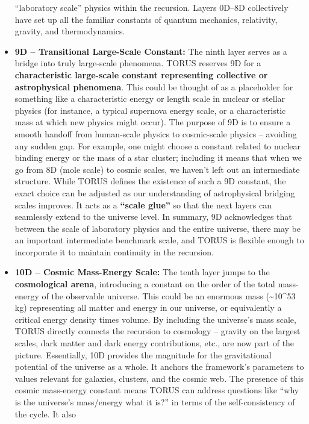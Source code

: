 \begin{itemize}
  ``laboratory scale'' physics within the recursion. Layers 0D--8D
  collectively have set up all the familiar constants of quantum
  mechanics, relativity, gravity, and thermodynamics.
\item
  \textbf{9D -- Transitional Large-Scale Constant:} The ninth layer
  serves as a bridge into truly large-scale phenomena. TORUS reserves 9D
  for a \textbf{characteristic large-scale constant representing
  collective or astrophysical phenomena}. This could be thought of as a
  placeholder for something like a characteristic energy or length scale
  in nuclear or stellar physics (for instance, a typical supernova
  energy scale, or a characteristic mass at which new physics might
  occur). The purpose of 9D is to ensure a smooth handoff from
  human-scale physics to cosmic-scale physics -- avoiding any sudden
  gap. For example, one might choose a constant related to nuclear
  binding energy or the mass of a star cluster; including it means that
  when we go from 8D (mole scale) to cosmic scales, we haven't left out
  an intermediate structure. While TORUS defines the existence of such a
  9D constant, the exact choice can be adjusted as our understanding of
  astrophysical bridging scales improves. It acts as a \textbf{``scale
  glue''} so that the next layers can seamlessly extend to the universe
  level. In summary, 9D acknowledges that between the scale of
  laboratory physics and the entire universe, there may be an important
  intermediate benchmark scale, and TORUS is flexible enough to
  incorporate it to maintain continuity in the recursion.
\item
  \textbf{10D -- Cosmic Mass-Energy Scale:} The tenth layer jumps to the
  \textbf{cosmological arena}, introducing a constant on the order of
  the total mass-energy of the observable universe. This could be an
  enormous mass (\textasciitilde{}10\^{}53 kg) representing all matter
  and energy in our universe, or equivalently a critical energy density
  times volume. By including the universe's mass scale, TORUS directly
  connects the recursion to cosmology -- gravity on the largest scales,
  dark matter and dark energy contributions, etc., are now part of the
  picture. Essentially, 10D provides the magnitude for the gravitational
  potential of the universe as a whole. It anchors the framework's
  parameters to values relevant for galaxies, clusters, and the cosmic
  web. The presence of this cosmic mass-energy constant means TORUS can
  address questions like ``why is the universe's mass/energy what it
  is?'' in terms of the self-consistency of the cycle. It also

\end{itemize}
